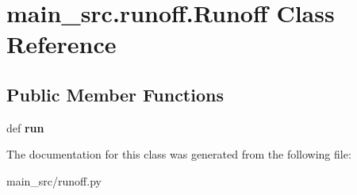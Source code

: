 \hypertarget{classmain__src_1_1runoff_1_1Runoff}{\section{main\-\_\-src.\-runoff.\-Runoff Class Reference}
\label{classmain__src_1_1runoff_1_1Runoff}
}
\subsection*{Public Member Functions}
\begin{DoxyCompactItemize}
\item 
\hypertarget{classmain__src_1_1runoff_1_1Runoff_a09aa3007c96dbbf3e695b40d2d0d8a95}{def {\bfseries run}}\label{classmain__src_1_1runoff_1_1Runoff_a09aa3007c96dbbf3e695b40d2d0d8a95}

\end{DoxyCompactItemize}


The documentation for this class was generated from the following file\-:\begin{DoxyCompactItemize}
\item 
main\-\_\-src/runoff.\-py\end{DoxyCompactItemize}
